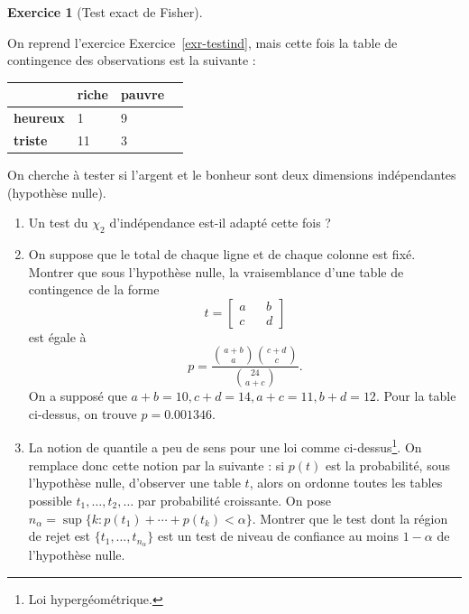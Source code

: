 \documentclass[
  10,
  letterpaper,
  DIV=11,
  numbers=noendperiod]{scrreport}
\providecommand{\tightlist}{%
  \setlength{\itemsep}{0pt}\setlength{\parskip}{0pt}}\usepackage{longtable,booktabs,array}
\theoremstyle{plain}
\theoremstyle{definition}
\newtheorem{exercise}{Exercice}[chapter]
\theoremstyle{plain}
\theoremstyle{definition}
\theoremstyle{definition}
\theoremstyle{plain}
\theoremstyle{remark}
\begin{document}
\begin{exercise}[Test exact de
Fisher]\protect\hypertarget{exr-testexactfisher}{}\label{exr-testexactfisher}

On reprend l'exercice Exercice~\ref{exr-testind}, mais cette fois la
table de contingence des observations est la suivante :~

\begin{longtable}[]{@{}llll@{}}
\toprule\noalign{}
& riche & pauvre & \\
\midrule\noalign{}
\endhead
\bottomrule\noalign{}
\endlastfoot
\textbf{heureux} & 1 & 9 & \\
\textbf{triste} & 11 & 3 & \\
\end{longtable}

On cherche à tester si l'argent et le bonheur sont deux dimensions
indépendantes (hypothèse nulle).

\begin{enumerate}
\def\labelenumi{\arabic{enumi}.}
\tightlist
\item
  Un test du \(\chi_2\) d'indépendance est-il adapté cette fois ?
\item
  On suppose que le total de chaque ligne et de chaque colonne est fixé.
  Montrer que sous l'hypothèse nulle, la vraisemblance d'une table de
  contingence de la forme
  \[t=\begin{bmatrix} a && b \\ c && d \end{bmatrix}\] est égale à
  \[p = \frac{\binom{a+b}{a}\binom{c+d}{c}}{\binom{24}{a+c}}. \] On a
  supposé que \(a+b = 10, c+d = 14, a+c=11, b+d=12\). Pour la table
  ci-dessus, on trouve \(p = 0.001346\).
\item
  La notion de quantile a peu de sens pour une loi comme
  ci-dessus\footnote{Loi hypergéométrique.}. On remplace donc cette
  notion par la suivante : si \(p(t)\) est la probabilité, sous
  l'hypothèse nulle, d'observer une table \(t\), alors on ordonne toutes
  les tables possible \(t_1, \dotsc, t_2, \dots\) par probabilité
  croissante. On pose
  \(n_\alpha = \sup\{k : p(t_1) + \dotsb + p(t_k)<\alpha\}\). Montrer
  que le test dont la région de rejet est
  \(\{t_1, \dotsc, t_{n_\alpha}\}\) est un test de niveau de confiance
  au moins \(1-\alpha\) de l'hypothèse nulle.
\end{enumerate}

\end{exercise}

\end{document}
